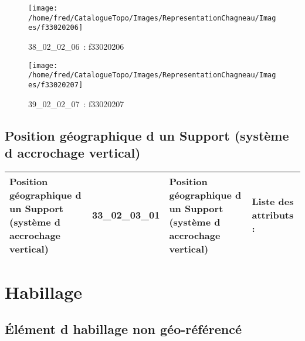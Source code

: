 \documentclass[12pt,titlepage]{book}
\begin{document}
\begin{figure}[h!]
\begin{minipage}[t]{3cm}
    \begin{center}
      \texttt{[image: /home/fred/CatalogueTopo/Images/RepresentationChagneau/Images/f33020206]}
      \caption[~38\_02\_02\_06]{\small{38\_02\_02\_06~:} \tiny{f33020206}}\label{f33020206}
    \end{center}
  \end{minipage}
  \begin{minipage}[t]{3cm}
    \begin{center}
      \texttt{[image: /home/fred/CatalogueTopo/Images/RepresentationChagneau/Images/f33020207]}
      \caption[~39\_02\_02\_07]{\small{39\_02\_02\_07~:} \tiny{f33020207}}\label{f33020207}
    \end{center}
  \end{minipage}
\end{figure}


\subsection{Position géographique d un Support (système d accrochage vertical)}
\noindent
\vspace{\baselineskip}

\renewcommand{\arraystretch}{1.2}
\begin{supertabular}{|p{10cm}|c|p{13cm}|p{12cm}|}
 Position géographique d un Support (système d accrochage vertical) & 33\_02\_03\_01 & Position géographique d un Support (système d accrochage vertical) & Liste des attributs :
\begin{enumerate}
\end{enumerate}
\\
\hline
\end{supertabular}
\begin{figure}[h!]
  \hfill         %
\end{figure}

\section{\large Habillage}
\subsection{Élément d habillage non géo-référencé}
\noindent
\vspace{\baselineskip}
\end{document}
